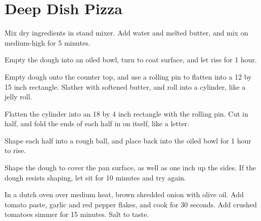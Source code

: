 \section{Deep Dish Pizza}
\begin{recipe}



Mix dry ingredients in stand mixer. Add water and melted butter, and mix on medium-high for 5 minutes.

Empty the dough into an oiled bowl, turn to coat surface, and let rise for 1 hour.

Empty dough onto the counter top, and use a rolling pin to flatten into a 12 by 15 inch rectangle. Slather with softened butter, and roll into a cylinder, like a jelly roll.

Flatten the cylinder into an 18 by 4 inch rectangle with the rolling pin. Cut in half, and fold the ends of each half in on itself, like a letter.

Shape each half into a rough ball, and place back into the oiled bowl for 1 hour to rise.

Shape the dough to cover the pan surface, as well as one inch up the sides. If the dough resists shaping, let sit for 10 minutes and try again.


In a dutch oven over medium heat, brown shredded onion with olive oil. Add tomato paste, garlic and red pepper flakes, and cook for 30 seconds. Add crushed tomatoes simmer for 15 minutes. Salt to taste.


\end{recipe}
